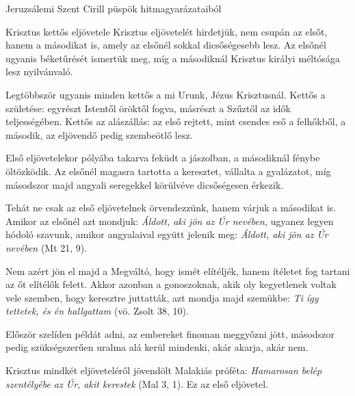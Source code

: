\documentclass[twoside]{article}
\begin{document}

Jeruzsálemi Szent Cirill püspök hitmagyarázataiból

{\centering{}}

\begin{lectio}{Krisztus kettős eljövetele}
\noindent Krisztus eljövetelét hirdetjük, nem csupán az elsőt, hanem a másodikat is, amely az elsőnél sokkal dicsőségesebb lesz. Az elsőnél ugyanis béketűrését ismertük meg, míg a másodiknál Krisztus királyi méltósága lesz nyilvánvaló.

Legtöbbször ugyanis minden kettős a mi Urunk, Jézus Krisztusnál. Kettős a születése: egyrészt Istentől öröktől fogva, másrészt a Szűztől az idők teljességében. Kettős az alászállás: az első rejtett, mint csendes eső a felhőkből, a második, az eljövendő pedig szembeötlő lesz.

Első eljövetelekor pólyába takarva feküdt a jászolban, a másodiknál fénybe öltözködik. Az elsőnél magasra tartotta a keresztet, vállalta a gyalázatot, míg másodszor majd angyali seregekkel körülvéve dicsőségesen érkezik.

Tehát ne csak az első eljövetelnek örvendezzünk, hanem várjuk a másodikat is. Amikor az elsőnél azt mondjuk: \textit{Áldott, aki jön az Úr nevében,} ugyanez legyen hódoló szavunk, amikor angyalaival együtt jelenik meg: \textit{Áldott, aki jön az Úr nevében} (Mt 21, 9).

Nem azért jön el majd a Megváltó, hogy ismét elítéljék, hanem ítéletet fog tartani az őt elítélők felett. Akkor azonban a gonoszoknak, akik oly kegyetlenek voltak vele szemben, hogy keresztre juttatták, azt mondja majd szemükbe: \textit{Ti így tettetek, és én hallgattam} (vö. Zsolt 38, 10).

Először szelíden példát adni, az embereket finoman meggyőzni jött, másodszor pedig szükségszerűen uralma alá kerül mindenki, akár akarja, akár nem.

Krisztus mindkét eljöveteléről jövendölt Malakiás próféta: \textit{Hamarosan belép szentélyébe az Úr, akit kerestek} (Mal 3, 1). Ez az első eljövetel.


\end{lectio}
\end{document}
